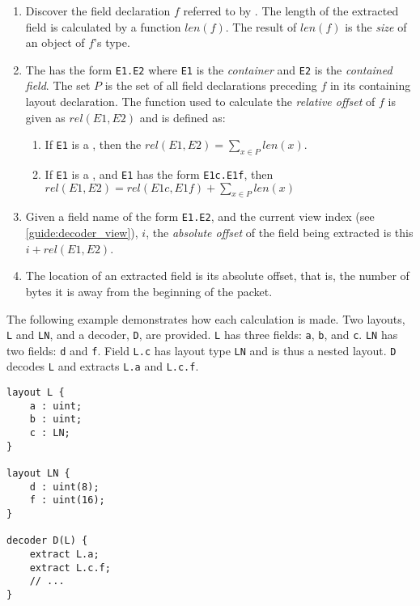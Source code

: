 \begin{enumerate}
\item Discover the field declaration $f$ referred to by . The length of the extracted field is calculated by a function $len(f)$. The result of $len(f)$ is the \textit{size} of an object of $f$'s type.

\item The  has the form \texttt{E1.E2} where \texttt{E1} is the \textit{container} and \texttt{E2} is the \textit{contained field}. The set $P$ is the set of all field declarations preceding $f$ in its containing layout declaration. The function used to calculate the \textit{relative offset} of $f$ is given as $rel(E1, E2)$ and is defined as:

\begin{enumerate}

\item If \texttt{E1} is a , then the $rel(E1, E2) = \sum_{x \in P}{} len(x)$.

\item If \texttt{E1} is a , and \texttt{E1} has the form \texttt{E1c.E1f}, then $rel(E1, E2) = rel(E1c, E1f) + \sum_{x \in P}{} len(x)$

\end{enumerate}

\item Given a field name of the form \texttt{E1.E2}, and the current view index (see \ref{guide:decoder_view}), $i$, the \textit{absolute offset} of the field being extracted is this $i + rel(E1, E2)$.

\item The location of an extracted field is its absolute offset, that is, the number of bytes it is away from the beginning of the packet.
\end{enumerate}

The following example demonstrates how each calculation is made. Two layouts, \texttt{L} and \texttt{LN}, and a decoder, \texttt{D}, are provided. \texttt{L} has three fields: \texttt{a}, \texttt{b}, and \texttt{c}.  \texttt{LN} has two fields: \texttt{d} and \texttt{f}. Field \texttt{L.c} has layout type \texttt{LN} and is thus a nested layout. \texttt{D} decodes \texttt{L} and extracts \texttt{L.a} and \texttt{L.c.f}.

\begin{minip}
\begin{lstlisting}
layout L {
	a : uint;
	b : uint;
	c : LN;
}

layout LN {
	d : uint(8);
	f : uint(16);
}

decoder D(L) {
	extract L.a;
	extract L.c.f;
	// ...
}
\end{lstlisting}
\end{minip}


